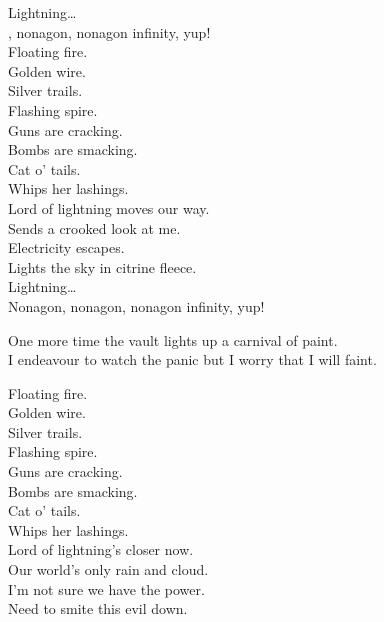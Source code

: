 Lightning… \\

, nonagon, nonagon infinity, yup! \\

Floating fire. \\
Golden wire. \\
Silver trails. \\
Flashing spire. \\

Guns are cracking. \\
Bombs are smacking. \\
Cat o' tails. \\
Whips her lashings. \\

Lord of lightning moves our way. \\
Sends a crooked look at me. \\
Electricity escapes. \\
Lights the sky in citrine fleece. \\

Lightning… \\

Nonagon, nonagon, nonagon infinity, yup! \\


One more time the vault lights up a carnival of paint. \\
I endeavour to watch the panic but I worry that I will faint. \\


Floating fire. \\
Golden wire. \\
Silver trails. \\
Flashing spire. \\

Guns are cracking. \\
Bombs are smacking. \\
Cat o' tails. \\
Whips her lashings. \\

Lord of lightning's closer now. \\
Our world's only rain and cloud. \\
I'm not sure we have the power. \\
Need to smite this evil down. \\

